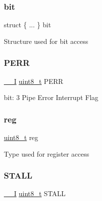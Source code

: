 \subsubsection{\texorpdfstring{bit}{bit}}
{\footnotesize\ttfamily struct \{ ... \}   bit}

Structure used for bit access \mbox{\label{union_u_s_b___h_o_s_t___p_i_n_t_f_l_a_g___type_a35d1d3d3d464f902d3910be5b7ded7fa}} 
\subsubsection{\texorpdfstring{PERR}{PERR}}
{\footnotesize\ttfamily \mbox{\hyperlink{core__cm0plus_8h_af63697ed9952cc71e1225efe205f6cd3}{\+\_\+\+\_\+I}} \mbox{\hyperlink{union_u_s_b___h_o_s_t___p_i_n_t_f_l_a_g___type_a5b4208c6f4c4a4290c4f2804d1eb1d5b}{uint8\+\_\+t}} P\+E\+RR}

bit\+: 3 Pipe Error Interrupt Flag \mbox{\label{union_u_s_b___h_o_s_t___p_i_n_t_f_l_a_g___type_a9428adc9af4653a2050e2536b55dec8d}} 
\subsubsection{\texorpdfstring{reg}{reg}}
{\footnotesize\ttfamily \mbox{\hyperlink{union_u_s_b___h_o_s_t___p_i_n_t_f_l_a_g___type_a5b4208c6f4c4a4290c4f2804d1eb1d5b}{uint8\+\_\+t}} reg}

Type used for register access \mbox{\label{union_u_s_b___h_o_s_t___p_i_n_t_f_l_a_g___type_aaaff6eaa97c3367c599d62f54cfd890e}} 
\subsubsection{\texorpdfstring{STALL}{STALL}}
{\footnotesize\ttfamily \mbox{\hyperlink{core__cm0plus_8h_af63697ed9952cc71e1225efe205f6cd3}{\+\_\+\+\_\+I}} \mbox{\hyperlink{union_u_s_b___h_o_s_t___p_i_n_t_f_l_a_g___type_a5b4208c6f4c4a4290c4f2804d1eb1d5b}{uint8\+\_\+t}} S\+T\+A\+LL}

